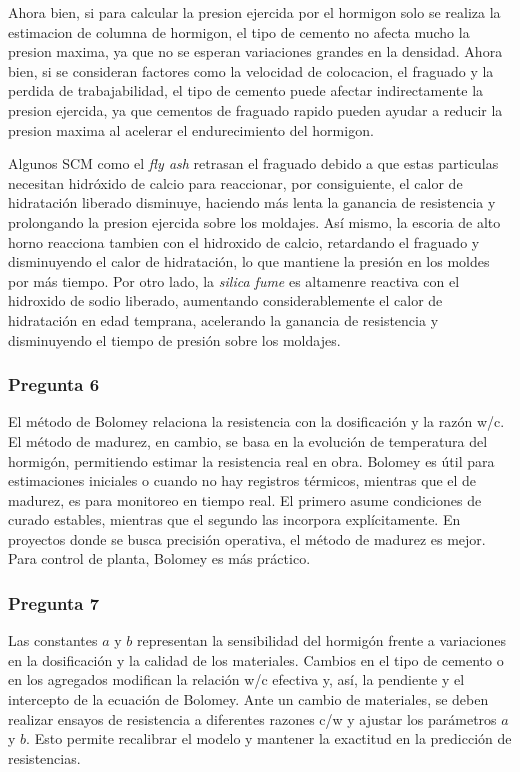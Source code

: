 Ahora bien, si para calcular la presion ejercida por el hormigon solo se realiza la estimacion de columna de hormigon, el tipo de cemento no afecta mucho la presion maxima, ya que no se esperan variaciones grandes en la densidad. Ahora bien, si se consideran factores como la velocidad de colocacion, el fraguado y la perdida de trabajabilidad, el tipo de cemento puede afectar indirectamente la presion ejercida, ya que cementos de fraguado rapido pueden ayudar a reducir la presion maxima al acelerar el endurecimiento del hormigon.

Algunos SCM como el \textit{fly ash} retrasan el fraguado debido a que estas particulas necesitan hidróxido de calcio para reaccionar, por consiguiente, el calor de hidratación liberado disminuye, haciendo más lenta la ganancia de resistencia y prolongando la presion ejercida sobre los moldajes. Así mismo, la escoria de alto horno reacciona tambien con el hidroxido de calcio, retardando el fraguado y disminuyendo el calor de hidratación, lo que mantiene la presión en los moldes por más tiempo. Por otro lado, la \textit{silica fume} es altamenre reactiva con el hidroxido de sodio liberado, aumentando considerablemente el calor de hidratación en edad temprana, acelerando la ganancia de resistencia y disminuyendo el tiempo de presión sobre los moldajes.

\subsubsection*{Pregunta 6} 
El método de Bolomey relaciona la resistencia con la dosificación y la razón w/c. El método de madurez, en cambio, se basa en la evolución de temperatura del hormigón, permitiendo estimar la resistencia real en obra. Bolomey es útil para estimaciones iniciales o cuando no hay registros térmicos, mientras que el de madurez, es para monitoreo en tiempo real. El primero asume condiciones de curado estables, mientras que el segundo las incorpora explícitamente. En proyectos donde se busca precisión operativa, el método de madurez es mejor. Para control de planta, Bolomey es más práctico.

\subsubsection*{Pregunta 7} 
Las constantes \( a \) y \( b \) representan la sensibilidad del hormigón frente a variaciones en la dosificación y la calidad de los materiales. Cambios en el tipo de cemento o en los agregados modifican la relación w/c efectiva y, así, la pendiente y el intercepto de la ecuación de Bolomey. Ante un cambio de materiales, se deben realizar ensayos de resistencia a diferentes razones c/w y ajustar los parámetros \( a \) y \( b \). Esto permite recalibrar el modelo y mantener la exactitud en la predicción de resistencias.

